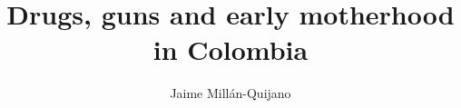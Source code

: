 \documentclass[preprint]{elsarticle}
\begin{document}
\begin{frontmatter}
	\title{Drugs, guns and early motherhood in Colombia}

	\author{Jaime Mill\'an-Quijano}
	\address{Universidad Carlos III de Madrid \\
		 Departamento de Econom\'ia \\
		 Despacho 15.2.42 \\
		 Calle Madrid 126, Getafe \\
		 28093, Spain \\
		 jmillan@eco.uc3m.es}
\end{frontmatter}
\end{document}

